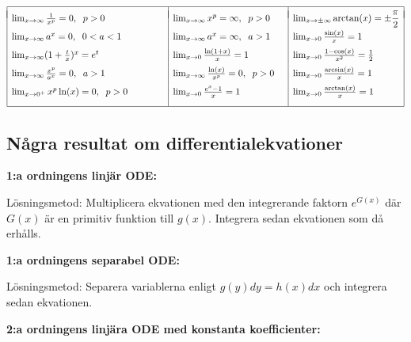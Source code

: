 \documentclass{article}
\begin{document}
\def\EndRow{\\*[6pt]}
$\begin{array}{|ll|ll|l|}\hline& &&&\\*[-8pt]
  \lim_{x\rightarrow\infty}\frac{1}{x^p}=0, \hspace{2 mm} p>0 & &\lim_{x\rightarrow\infty}x^p=\infty,\hspace{2 mm} p>0&& \lim_{x\to\pm\infty}\arctan(x)=\pm\dfrac{\pi}{2}
\EndRow
  \lim_{x\rightarrow\infty}a^x=0,\hspace{2 mm} 0<a<1 & &\lim_{x\rightarrow\infty}a^x=\infty, \hspace{2 mm}a>1 &&\lim_{x\to0}\frac{\sin(x)}x=1
\EndRow
\lim_{x\rightarrow\infty}(1+\frac{t}{x})^x=e^t & &\lim_{x\rightarrow 0}\frac{\ln(1+x)}{x}=1 &&\lim_{x\rightarrow 0}\frac{1-\cos(x)}{x^2}=\frac12 
\EndRow \lim_{x\rightarrow \infty}\frac{x^p}{a^x}=0, \hspace{2 mm} a>1 & &\lim_{x\rightarrow\infty}\frac{\ln(x)}{x^p}=0, \hspace{2 mm}p>0&&\lim_{x\rightarrow 0}\frac{\arcsin(x)}{x}=1 
\EndRow
\lim_{x\rightarrow0^+}x^p\ln(x)=0, \hspace{2 mm}p>0 \hspace{10 mm}& & \lim_{x\rightarrow 0}\frac{e^x-1}{x}=1 && \lim_{x\rightarrow 0}\frac{\arctan(x)}{x}=1 
\\*[9pt]\hline
\end{array}$

\subsection*{Några resultat om differentialekvationer}%

\textbf{1:a ordningens linjär ODE:} %

Lösningsmetod: Multiplicera ekvationen med den integrerande faktorn $e^{G(x)}$
där $G(x)$ är en primitiv funktion till $g(x)$. Integrera sedan ekvationen som
då erhålls.

\vspace{5 mm}

\textbf{1:a ordningens separabel ODE:} 

Lösningsmetod: Separera variablerna enligt $g(y)dy=h(x)dx$ och integrera sedan
ekvationen.

\vspace{5 mm}

\textbf{2:a ordningens linjära ODE med konstanta koefficienter:} 
\end{document}
